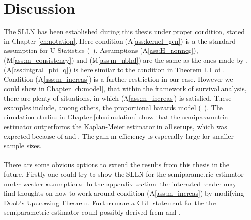 \chapter{Discussion}
%
The SLLN has been established during this thesis under proper condition, stated in Chapter \ref{ch:notation}. Here condition (A\ref{ass:kernel_gen}) is a the standard assumption for U-Statistics (\cf\ \cite{lee1990u}). Assumptions (A\ref{ass:H_nonneg}), (M\ref{ass:m_consistency}) and (M\ref{ass:m_nbhd}) are the same as the ones made by \cite{dikta2000strong}. (A\ref{ass:intgral_phi_q}) is here similar to the condition in Theorem 1.1 of \cite{dikta2000strong}. Condition (A\ref{ass:m_increas}) is a further restriction in our case. However we could show in Chapter \ref{ch:model}, that within the framework of survival analysis, there are plenty of situations, in which (A\ref{ass:m_increas}) is satisfied. These examples include, among others, the proportional hazards model (\cf\ \cite{koziol1976cramer}). The simulation studies in Chapter \ref{ch:simulation} show that the semiparametric estimator outperforms the Kaplan-Meier estimator in all setups, which was expected because of \cite{dikta2005central} and \cite{dikta2014efficient}. The gain in efficiency is especially large for smaller sample sizes.\\
\\
There are some obvious options to extend the results from this thesis in the future. Firstly one could try to show the SLLN for the semiparametric estimator under weaker assumptions. In the appendix section, the interested reader may find thoughts on how to work around condition (A\ref{ass:m_increas}) by modifying Doob's Upcrossing Theorem. Furthermore a CLT statement for the the semiparametric estimator could possibly derived from \cite{dikta2005central} and \cite{bose2002asymptotic}. 